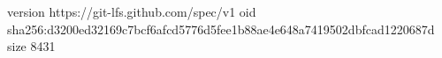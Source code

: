 version https://git-lfs.github.com/spec/v1
oid sha256:d3200ed32169c7bcf6afcd5776d5fee1b88ae4e648a7419502dbfcad1220687d
size 8431
